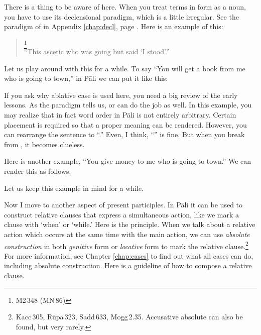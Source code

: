There is a thing to be aware of here. When you treat terms in  form as a noun, you have to use its declensional paradigm, which is a little irregular. See the paradigm of  in Appendix \ref{chap:decl}, page \pageref{decl:gacchanta}. Here is an example of this:

\begin{quote}
\footnote{M2\,348 (MN\,86)}\\
``This ascetic who was going but said `I stood'.''\\
\end{quote}

Let us play around with this for a while. To say ``You will get a book from me who is going to town,'' in P\=ali we can put it like this:


If you ask why ablative case is used here, you need a big review of the early lessons. As the paradigm tells us,  or  can do the job as well. In this example, you may realize that in fact word order in P\=ali is not entirely arbitrary. Certain placement is required so that a proper meaning can be rendered. However, you can rearrange the sentence to ``.'' Even, I think, ``'' is fine. But when you break  from , it becomes clueless.

Here is another example, ``You give money to me who is going to town.'' We can render this as follows:


Let us keep this example in mind for a while.

Now I move to another aspect of present participles. In P\=ali it can be used to construct relative clauses that express a simultaneous action, like we mark a clause with `when' or `while.' Here is the principle. When we talk about a relative action which occurs at the same time with the main action, we can use \emph{absolute construction} in both \emph{genitive} form or \emph{locative} form to mark the relative clause.\footnote{Kacc\,305, R\=upa\,323, Sadd\,633, Mogg\,2.35. Accusative absolute can also be found, but very rarely.} For more information, see Chapter \ref{chap:cases} to find out what all cases can do, including absolute construction. Here is a guideline of how to compose a relative clause.

